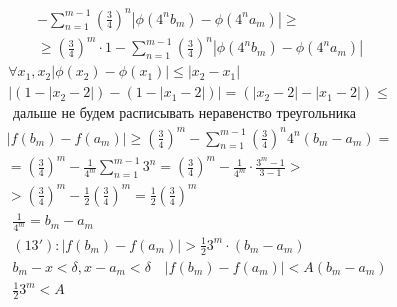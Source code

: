 \documentclass[main]{subfiles}
\begin{document}
\begin{example}
\begin{multline*}
          -\sum_{n=1}^{m-1} \left( \frac{3}{4} \right)^n | \phi(4^nb_m) - \phi(4^na_m)| \geq \\
           \geq   \left( \frac{3}{4} \right)^m \cdot 1 
          - \sum^{m-1}_{n=1} \left( \frac{3}{4} \right)^n |\phi(4^nb_m)-\phi(4^na_m)|\end{multline*}
          \begin{gather*}
          \forall x_1, x_2 |\phi(x_2) - \phi(x_1)| \leq |x_2 -x_1| \tag{12} \\
          |(1-|x_2-2|) - (1-|x_1-2|)| = (|x_2-2| - |x_1-2|) \leq \\
          \text{ дальше не будем расписывать неравенство треугольника} 
          \end{gather*}
          \begin{multline*}
  |f(b_m) - f(a_m)| \geq \left( \frac{3}{4} \right)^m - \sum_{n=1}^{m-1} \left( \frac{3}{4} \right)^n
          4^n(b_m - a_m) =\\
          = \left( \frac{3}{4} \right)^m - \frac{1}{4^m} \sum_{n=1}^{m-1}3^n =
          \left( \frac{3}{4} \right)^m - \frac{1}{4^m} \cdot \frac{3^m-1}{3-1} > \\ 
          > \left( \frac{3}{4} \right)^m - \frac{1}{2} \left( \frac{3}{4} \right)^m
          = \frac{1}{2} \left( \frac{3}{4} \right)^m \tag{13} \end{multline*}
          \begin{gather*}
          \frac{1}{4^m} = b_m - a_m \\
          (13\prime) : |f(b_m) - f(a_m)| > \frac{1}{2} 3^m \cdot (b_m-a_m) \\
          b_m - x < \delta, x - a_m < \delta \quad |f(b_m) - f(a_m)| < A (b_m-a_m) \\
          \frac{1}{2} 3^m < A
     \end{gather*} 
\end{example}
\end{document}
